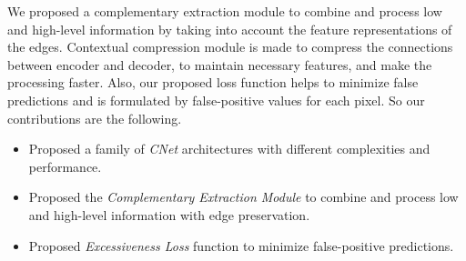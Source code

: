 \documentclass[10pt,twocolumn,letterpaper]{article}
\begin{document}
We proposed a complementary extraction module to combine and process low and high-level information by taking into account the feature representations of the edges. Contextual compression module is made to compress the connections between encoder and decoder, to maintain necessary features, and make the processing faster. Also, our proposed loss function helps to minimize false predictions and is formulated by false-positive values for each pixel. So our contributions are the following.

\begin{itemize}
  \item Proposed a family of \textit{CNet} architectures with different complexities and performance.
  \item Proposed the \textit{Complementary Extraction Module} to combine and process low and high-level information with edge preservation.
  \item Proposed \textit{Excessiveness Loss} function to minimize false-positive predictions.
\end{itemize}
\end{document}
